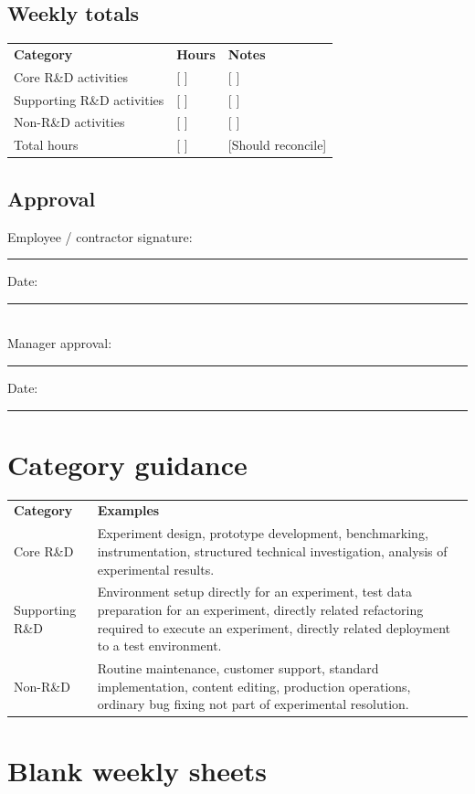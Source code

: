 \documentclass[11pt]{article}
\begin{document}
\subsection{Weekly totals}
\begin{tabularx}{\textwidth}{L{4.0cm}C{2.4cm}Y}
\textbf{Category} & \textbf{Hours} & \textbf{Notes} \\
Core R\&D activities & [ ] & [ ] \\
Supporting R\&D activities & [ ] & [ ] \\
Non-R\&D activities & [ ] & [ ] \\
Total hours & [ ] & [Should reconcile] \\
\end{tabularx}

\subsection{Approval}
Employee / contractor signature: \rule{5cm}{0.4pt} \hfill Date: \rule{3cm}{0.4pt}\\[0.4cm]
Manager approval: \rule{5cm}{0.4pt} \hfill Date: \rule{3cm}{0.4pt}

\clearpage
\section{Category guidance}
\begin{xltabular}{\textwidth}{L{3.2cm}Y}
\textbf{Category} & \textbf{Examples} \\
Core R\&D & Experiment design, prototype development, benchmarking, instrumentation, structured technical investigation, analysis of experimental results. \\
Supporting R\&D & Environment setup directly for an experiment, test data preparation for an experiment, directly related refactoring required to execute an experiment, directly related deployment to a test environment. \\
Non-R\&D & Routine maintenance, customer support, standard implementation, content editing, production operations, ordinary bug fixing not part of experimental resolution. \\
\end{xltabular}

\section{Blank weekly sheets}
\end{document}
